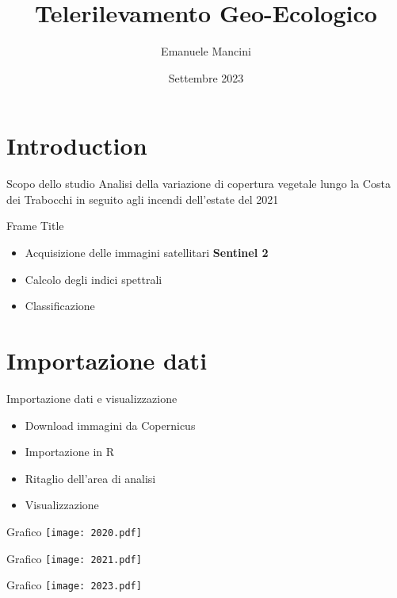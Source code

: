 \documentclass{beamer}
\title{Telerilevamento Geo-Ecologico}
\author{Emanuele Mancini}
\date{Settembre 2023}
\begin{document}
\maketitle

\section{Introduction}

\begin{frame}{Scopo dello studio}
Analisi della variazione di copertura vegetale lungo la Costa dei Trabocchi in seguito agli incendi dell'estate del 2021
\end{frame}

\begin{frame}{Frame Title}
\begin{itemize}
    \item Acquisizione delle immagini satellitari \textbf{Sentinel 2}
    \item \pause Calcolo degli indici spettrali
    \item \pause Classificazione
\end{itemize}    
\end{frame}

\section{Importazione dati}

\begin{frame}{Importazione dati e visualizzazione}
\begin{itemize}
    \item Download immagini da Copernicus
    \item \pause Importazione in R
    \item \pause Ritaglio dell'area di analisi
    \item \pause Visualizzazione
\end{itemize}
    
\end{frame}

\begin{frame}{Grafico}
\centering
\texttt{[image: 2020.pdf]}
\end{frame}

\begin{frame}{Grafico}
\centering
\texttt{[image: 2021.pdf]}
\end{frame}

\begin{frame}{Grafico}
\centering
\texttt{[image: 2023.pdf]}
\end{frame}
\end{document}
